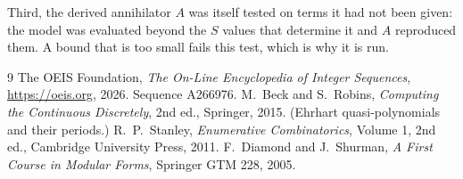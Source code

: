 \documentclass[11pt,a4paper]{article}
\theoremstyle{plain}
\theoremstyle{definition}
\begin{document}
Third, the derived annihilator $A$ was itself tested on terms it had not been given: the model
was evaluated beyond the $S$ values that determine it and $A$ reproduced them. A bound that is
too small fails this test, which is why it is run.

\begin{thebibliography}{9}
 The OEIS Foundation, \emph{The On-Line Encyclopedia of Integer
Sequences}, \url{https://oeis.org}, 2026. Sequence A266976.
 M.~Beck and S.~Robins, \emph{Computing the Continuous Discretely},
2nd ed., Springer, 2015. (Ehrhart quasi-polynomials and their periods.)
 R.~P.~Stanley, \emph{Enumerative Combinatorics}, Volume 1, 2nd ed.,
Cambridge University Press, 2011.
 F.~Diamond and J.~Shurman, \emph{A First Course in Modular Forms},
Springer GTM 228, 2005.
\end{thebibliography}
\end{document}
